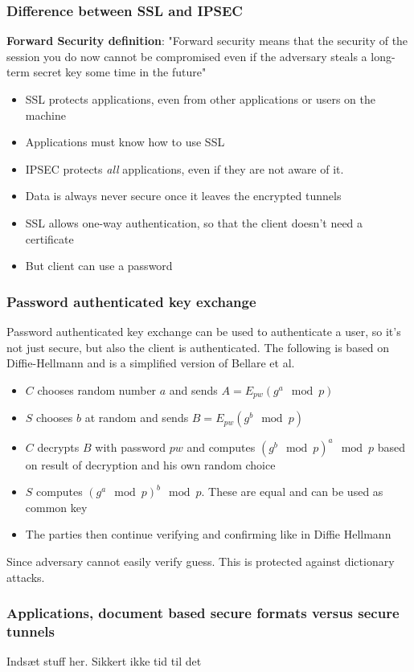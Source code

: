     \begin{frame}
        \frametitle{Difference between SSL and IPSEC}
        \textbf{Forward Security definition}: "Forward security means that the security of the session you do now cannot be compromised even if the adversary steals a long-term secret key some time in the future"
        \begin{itemize}
            \item SSL protects applications, even from other applications or users on the machine
            \item Applications must know how to use SSL
            \item IPSEC protects \textit{all} applications, even if they are not aware of it. 
            \item Data is always never secure once it leaves the encrypted tunnels
            \item SSL allows one-way authentication, so that the client doesn't need a certificate
            \item But client can use a password
        \end{itemize}
    \end{frame}

    \begin{frame}
        \frametitle{Password authenticated key exchange}
            Password authenticated key exchange can be used to authenticate a user, so it's not just secure, but also the client is authenticated. The following is based on Diffie-Hellmann and is a simplified version of Bellare et al.
            \begin{itemize}
                \item $C$ chooses random number $a$ and sends $A = E_{pw}(g^a \mod p)$
                \item $S$ chooses $b$ at random and sends $B = E_{pw}(g^b \mod p)$
                \item $C$ decrypts $B$ with password $pw$ and computes $(g^b \mod p)^a \mod p$ based on result of decryption and his own random choice
                \item $S$ computes $(g^a \mod p)^b \mod p$. These are equal and can be used as common key
                \item The parties then continue verifying and confirming like in Diffie Hellmann
            \end{itemize}
            Since adversary cannot easily verify guess. This is protected against dictionary attacks. 

    \end{frame}


    \begin{frame}
        \frametitle{Applications, document based secure formats versus secure tunnels}
            Indsæt stuff her. Sikkert ikke tid til det
    \end{frame}




